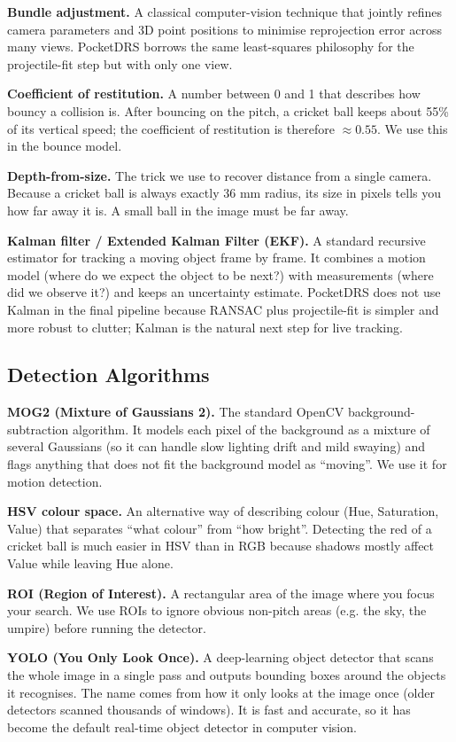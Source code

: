 \documentclass[11pt,a4paper]{article}
\begin{document}
\textbf{Bundle adjustment.} A classical computer-vision technique that jointly refines camera parameters and 3D point positions to minimise reprojection error across many views. PocketDRS borrows the same least-squares philosophy for the projectile-fit step but with only one view.

\textbf{Coefficient of restitution.} A number between 0 and 1 that describes how bouncy a collision is. After bouncing on the pitch, a cricket ball keeps about 55\% of its vertical speed; the coefficient of restitution is therefore $\approx 0.55$. We use this in the bounce model.

\textbf{Depth-from-size.} The trick we use to recover distance from a single camera. Because a cricket ball is always exactly 36 mm radius, its size in pixels tells you how far away it is. A small ball in the image must be far away.

\textbf{Kalman filter / Extended Kalman Filter (EKF).} A standard recursive estimator for tracking a moving object frame by frame. It combines a motion model (where do we expect the object to be next?) with measurements (where did we observe it?) and keeps an uncertainty estimate. PocketDRS does not use Kalman in the final pipeline because RANSAC plus projectile-fit is simpler and more robust to clutter; Kalman is the natural next step for live tracking.

\subsection{Detection Algorithms}

\textbf{MOG2 (Mixture of Gaussians 2).} The standard OpenCV background-subtraction algorithm. It models each pixel of the background as a mixture of several Gaussians (so it can handle slow lighting drift and mild swaying) and flags anything that does not fit the background model as ``moving''. We use it for motion detection.

\textbf{HSV colour space.} An alternative way of describing colour (Hue, Saturation, Value) that separates ``what colour'' from ``how bright''. Detecting the red of a cricket ball is much easier in HSV than in RGB because shadows mostly affect Value while leaving Hue alone.

\textbf{ROI (Region of Interest).} A rectangular area of the image where you focus your search. We use ROIs to ignore obvious non-pitch areas (e.g. the sky, the umpire) before running the detector.

\textbf{YOLO (You Only Look Once).} A deep-learning object detector that scans the whole image in a single pass and outputs bounding boxes around the objects it recognises. The name comes from how it only looks at the image once (older detectors scanned thousands of windows). It is fast and accurate, so it has become the default real-time object detector in computer vision.
\end{document}

